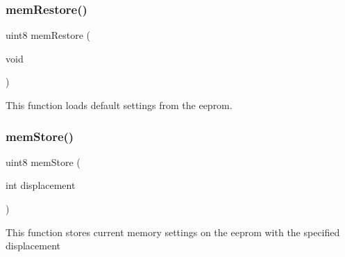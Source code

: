 \subsubsection{mem\+Restore()}
{\footnotesize\ttfamily uint8 mem\+Restore (\begin{DoxyParamCaption}\item[{void}]{ }\end{DoxyParamCaption})}

This function loads default settings from the eeprom. \mbox{\label{command__processing_8h_ad37da1fb5c1ccf35a9a53595b8bab54c}} 
\subsubsection{mem\+Store()}
{\footnotesize\ttfamily uint8 mem\+Store (\begin{DoxyParamCaption}\item[{int}]{displacement }\end{DoxyParamCaption})}

This function stores current memory settings on the eeprom with the specified displacement 